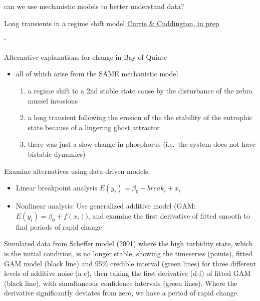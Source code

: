 \documentclass[
  ignorenonframetext,
]{beamer}
\providecommand{\tightlist}{%
  \setlength{\itemsep}{0pt}\setlength{\parskip}{0pt}}
\begin{document}
\begin{frame}{can we use mechanistic models to better understand data?}
\begin{block}{Long transients in a regime shift model}
\href{}{Currie \& Cuddington, in prep}

`
\end{block}

\begin{block}{Alternative explanations for change in Bay of Quinte}
\protect\hypertarget{alternative-explanations-for-change-in-bay-of-quinte}{}
\begin{itemize}
\item
  all of which arise from the SAME mechanistic model

  \begin{enumerate}
  \tightlist
  \item
    a regime shift to a 2nd stable state cause by the disturbance of the
    zebra mussel invasions
  \item
    a long transient following the erosion of the the stability of the
    eutrophic state because of a lingering ghost attractor
  \item
    there was just a slow change in phosphorus (i.e.~the system does not
    have bistable dynamics)
  \end{enumerate}
\end{itemize}
\end{block}

\begin{block}{Examine alternatives using data-driven models:}
\protect\hypertarget{examine-alternatives-using-data-driven-models}{}
\begin{itemize}
\tightlist
\item
  Linear breakpoint analysis \(E(y_i)=β_0+break_i+x_i\)
\item
  Nonlinear analysis: Use generalized additive model (GAM:
  \(E(y_i)=β_0+f(x_i)\)), and examine the first derivative of fitted
  smooth to find periods of rapid change
\end{itemize}

Simulated data from Scheffer model (2001) where the high turbidity
state, which is the initial condition, is no longer stable, showing the
timeseries (points), fitted GAM model (black line) and 95\% credible
interval (green lines) for three different levels of additive noise
(a-c), then taking the first derivative (d-f) of fitted GAM (black
line), with simultaneous confidence intervals (green lines). Where the
derivative significantly deviates from zero, we have a period of rapid
change.


\end{block}
\end{frame}
\end{document}

